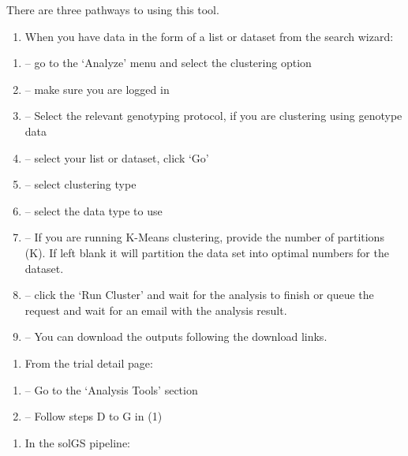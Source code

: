 \documentclass[
  12pt,
]{book}
\providecommand{\tightlist}{%
  \setlength{\itemsep}{0pt}\setlength{\parskip}{0pt}}
\begin{document}
There are three pathways to using this tool.

\begin{enumerate}
\def\labelenumi{(\arabic{enumi})}
\tightlist
\item
  When you have data in the form of a list or dataset from the search wizard:
\end{enumerate}

\begin{enumerate}
\def\labelenumi{(\Alph{enumi})}
\item
  -- go to the `Analyze' menu and select the clustering option
\item
  -- make sure you are logged in
\item
  -- Select the relevant genotyping protocol, if you are clustering using genotype data
\item
  -- select your list or dataset, click `Go'
\item
  -- select clustering type
\item
  -- select the data type to use
\item
  -- If you are running K-Means clustering, provide the number of partitions (K). If left blank it will partition the data set into optimal numbers for the dataset.
\item
  -- click the `Run Cluster' and wait for the analysis to finish or queue the request and wait for an email with the analysis result.
\item
  -- You can download the outputs following the download links.
\end{enumerate}

\begin{enumerate}
\def\labelenumi{(\arabic{enumi})}
\setcounter{enumi}{1}
\tightlist
\item
  From the trial detail page:
\end{enumerate}

\begin{enumerate}
\def\labelenumi{(\Alph{enumi})}
\item
  -- Go to the `Analysis Tools' section
\item
  -- Follow steps D to G in (1)
\end{enumerate}

\begin{enumerate}
\def\labelenumi{(\arabic{enumi})}
\setcounter{enumi}{2}
\tightlist
\item
  In the solGS pipeline:
\end{enumerate}
\end{document}
